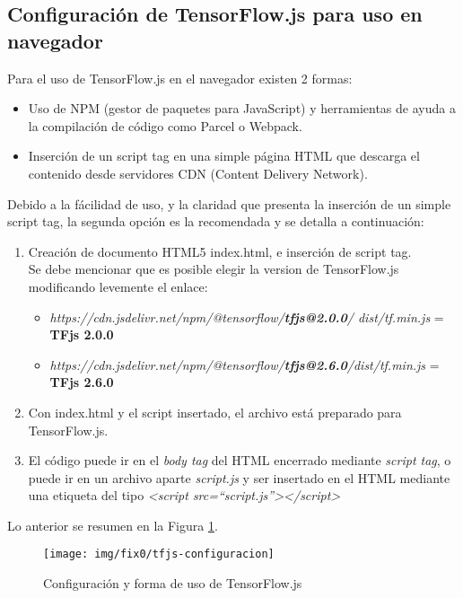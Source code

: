 \subsection{Configuración de TensorFlow.js para uso en navegador}
Para el uso de TensorFlow.js en el navegador existen 2 formas:
\begin{itemize}
    \item Uso de NPM (gestor de paquetes para JavaScript) y herramientas de ayuda a la compilación de código como Parcel o Webpack.
    \item Inserción de un script tag en una simple página HTML que descarga el contenido desde servidores CDN (Content Delivery Network).
\end{itemize}
Debido a la fácilidad de uso, y la claridad que presenta la inserción de un simple script tag, la segunda opción es la recomendada y se detalla a continuación:
\begin{enumerate}
    \item Creación de documento HTML5 index.html, e inserción de script tag.\\
        Se debe mencionar que es posible elegir la version de TensorFlow.js modificando levemente el enlace:
        \begin{itemize}
            \item \emph{https://cdn.jsdelivr.net/npm/@tensorflow/\textbf{tfjs@2.0.0}/
            dist/tf.min.js} = \textbf{TFjs 2.0.0}
            \item \emph{https://cdn.jsdelivr.net/npm/@tensorflow/\textbf{tfjs@2.6.0}/dist/tf.min.js} = \textbf{TFjs 2.6.0}
        \end{itemize}
    \item Con index.html y el script insertado, el archivo está preparado para TensorFlow.js.
    \item El código puede ir en el \emph{body tag} del HTML encerrado mediante \emph{script tag}, o puede ir en un archivo aparte \emph{script.js} y ser insertado en el HTML mediante una etiqueta del tipo \emph{<script src=``script.js''></script>}
\end{enumerate}
Lo anterior se resumen en la Figura \ref{fig:tfjs_configuracion}.


\begin{figure}[H]
    \texttt{[image: img/fix0/tfjs-configuracion]}
    \centering
    \caption{Configuración y forma de uso de TensorFlow.js}
    \label{fig:tfjs_configuracion}
\end{figure}


